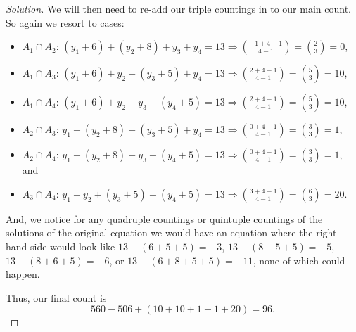 \documentclass[12pt]{amsart}
\newenvironment{solution}
{\begin{proof}[Solution]}
{\end{proof}}
\begin{document}
\begin{onehalfspace}
\begin{solution}
            We will then need to re-add our triple countings in to our main count.
            So again we resort to cases:
            \begin{itemize}
                \item[-] $A_1\cap A_2$: $(y_1 + 6) + (y_2 + 8) + y_3 + y_4 = 13 \Rightarrow \binom{-1+4-1}{4-1} = \binom{2}{3} = 0$,
                \item[-] $A_1\cap A_3$: $(y_1 + 6) + y_2 + (y_3 + 5) + y_4 = 13 \Rightarrow \binom{2+4-1}{4-1} = \binom{5}{3} = 10$,
                \item[-] $A_1\cap A_4$: $(y_1 + 6) + y_2 + y_3 + (y_4 + 5) = 13 \Rightarrow \binom{2+4-1}{4-1} = \binom{5}{3} = 10$,
                \item[-] $A_2\cap A_3$: $y_1 + (y_2 + 8) + (y_3 + 5) + y_4 = 13 \Rightarrow \binom{0+4-1}{4-1} = \binom{3}{3} = 1$,
                \item[-] $A_2\cap A_4$: $y_1 + (y_2 + 8) + y_3 + (y_4 + 5) = 13 \Rightarrow \binom{0+4-1}{4-1} = \binom{3}{3} = 1$, and
                \item[-] $A_3\cap A_4$: $y_1 + y_2 + (y_3 + 5) + (y_4 + 5) = 13 \Rightarrow \binom{3+4-1}{4-1} = \binom{6}{3} = 20$.
            \end{itemize}
            And, we notice for any quadruple countings or quintuple countings of the solutions of the original equation
            we would have an equation where the right hand side would look like $13 - (6+5+5) = -3$, $13 - (8+5+5) = -5$,
            $13 - (8+6+5) = -6$, or $13 - (6+8+5+5)=-11$, none of which could happen.

            Thus, our final count is
            \begin{displaymath}
                560 - 506 + (10 + 10 + 1+ 1+ 20) = 96.
            \end{displaymath}

        \end{solution}


\end{onehalfspace}
\end{document}
